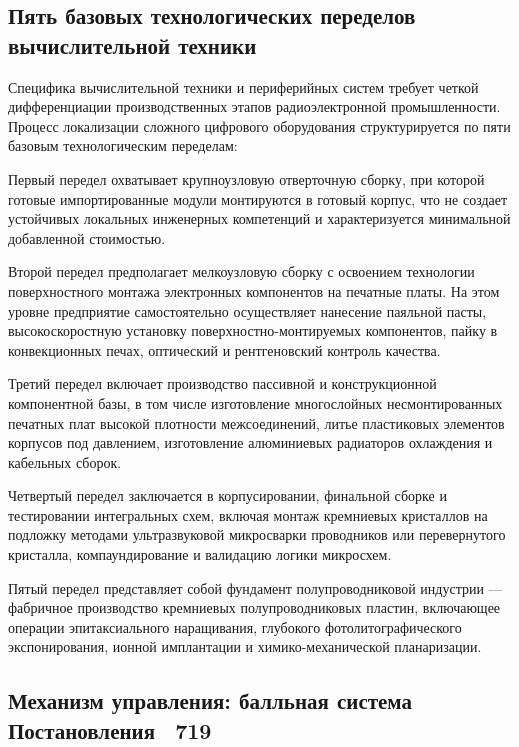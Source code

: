 \documentclass[12pt,a4paper]{article}
\begin{document}
\subsection{Пять базовых технологических переделов вычислительной 
техники}

Специфика вычислительной техники и периферийных систем требует четкой 
дифференциации производственных этапов радиоэлектронной 
промышленности. Процесс локализации сложного цифрового оборудования 
структурируется по пяти базовым технологическим переделам:

Первый передел охватывает крупноузловую отверточную сборку, при 
которой готовые импортированные 
модули монтируются в готовый корпус, что не создает устойчивых 
локальных инженерных компетенций и характеризуется минимальной 
добавленной стоимостью.

Второй передел предполагает мелкоузловую сборку с освоением 
технологии поверхностного монтажа электронных компонентов на 
печатные платы. На этом уровне предприятие самостоятельно 
осуществляет нанесение паяльной пасты, высокоскоростную установку 
поверхностно-монтируемых компонентов, пайку в конвекционных печах, 
оптический и рентгеновский контроль качества.

Третий передел включает производство пассивной и конструкционной 
компонентной базы, в том числе изготовление многослойных 
несмонтированных печатных плат высокой плотности межсоединений, 
литье пластиковых элементов корпусов под давлением, изготовление 
алюминиевых радиаторов охлаждения и кабельных сборок.

Четвертый передел заключается в корпусировании, финальной сборке и 
тестировании интегральных схем, включая монтаж кремниевых кристаллов 
на подложку методами ультразвуковой микросварки проводников или 
перевернутого кристалла, компаундирование и валидацию логики микросхем.

Пятый передел представляет собой фундамент полупроводниковой 
индустрии --- фабричное производство кремниевых полупроводниковых 
пластин, включающее операции эпитаксиального наращивания, глубокого 
фотолитографического экспонирования, ионной имплантации и 
химико-механической планаризации.

\subsection{Механизм управления: балльная система Постановления 
\textnumero~719}
\end{document}
